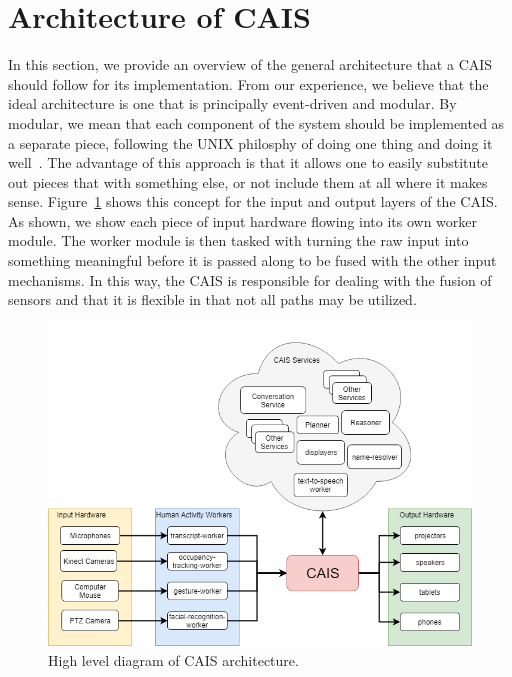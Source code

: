 \section{Architecture of CAIS}

In this section, we provide an overview of the general architecture that a
CAIS should follow for its implementation. From our experience, we believe
that the ideal architecture is one that is principally event-driven and
modular. By modular, we mean that each component of the system
should be implemented as a separate piece, following the UNIX philosphy of
doing one thing and doing it well~\cite{mcilroy_unix_1978}. The advantage of
this approach is that it allows one to easily substitute out pieces that with
something else, or not include them at all where it makes sense.
Figure~\ref{fig:cais_high_level} shows this concept for the input and output
layers of the CAIS. As shown, we show each piece of input hardware flowing
into its own worker module. The worker module is then tasked with turning the
raw input into something meaningful before it is passed along to be fused
with the other input mechanisms. In this way, the CAIS is responsible for
dealing with the fusion of sensors and that it is flexible in that not
all paths may be utilized.

\begin{figure}
    \centering
    \includegraphics[width=0.5\columnwidth]{chapters/02_technology/figures/cais_high_level.png}
    \caption{High level diagram of CAIS architecture.}
    \label{fig:cais_high_level}
\end{figure}


